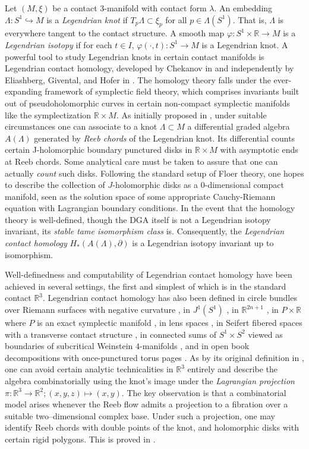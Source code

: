 \documentclass[11pt]{amsart}
\theoremstyle{mystyle}
\newcommand{\R}{\mathbb{R}}
\newcommand{\<}{\langle}
\renewcommand{\>}{\rangle}
\begin{document}
Let $(M,\xi)$ be a contact $3$-manifold with contact form $\lambda$. An embedding $\Lambda:S^1\hookrightarrow M$ is a \textit{Legendrian knot} if $T_p\Lambda\subset \xi_p$ for all $p\in \Lambda(S^1)$. That is, $\Lambda$ is everywhere tangent to the contact structure. A smooth map $\varphi:S^1\times \R\to M$ is a \textit{Legendrian isotopy} if for each $t\in I$, $\varphi(\cdot, t):S^1\to M$ is a Legendrian knot. A powerful tool to study Legendrian knots in certain contact manifolds is Legendrian contact homology, developed by Chekanov in \cite{chekanov2002dga} and independently by Eliashberg, Givental, and Hofer in \cite{egh2000SFT}. The homology theory falls under the ever-expanding framework of symplectic field theory, which comprises invariants built out of pseudoholomorphic curves in certain non-compact symplectic manifolds like the symplectization $\R\times M$. As initially proposed in \cite{egh2000SFT}, under suitable circumstances one can associate to a knot $\Lambda\subset M$ a differential graded algebra $A(\Lambda)$ generated by \textit{Reeb chords} of the Legendrian knot. Its differential counts certain J-holomorphic boundary punctured disks in $\R\times M$ with asymptotic ends at Reeb chords. Some analytical care must be taken to assure that one can actually \textit{count} such disks. Following the standard setup of Floer theory, one hopes to describe the collection of $J$-holomorphic disks as a $0$-dimensional compact manifold, seen as the solution space of some appropriate Cauchy-Riemann equation with Lagrangian boundary conditions. In the event that the homology theory is well-defined, though the DGA itself is not a Legendrian isotopy invariant, its \textit{stable tame isomorphism class} is. Consequently, the \textit{Legendrian contact homology} $H_*(A(\Lambda),\partial)$ is a Legendrian isotopy invariant up to isomorphism. 

Well-definedness and computability of Legendrian contact homology have been achieved in several settings, the first and simplest of which is in the standard contact $\R^3$. Legendrian contact homology has also been defined in circle bundles over Riemann surfaces with negative curvature \cite{sabloff2003circle}, in $J^1(S^1)$ \cite{NgTraynor2004}, in $\R^{2n+1}$ \cite{ekholm2005R2n+1}, in $P\times \R$ where $P$ is an exact symplectic manifold \cite{ekholm2007PxR} \cite{Bjorklund2016}, in lens spaces \cite{licata2011lensspaces}, in Seifert fibered spaces with a transverse contact structure \cite{licata2013seifert}, in connected sums of $S^1 \times S^2$ viewed as boundaries of subcritical Weinstein $4$-manifolds \cite{ekholmNg2015weinstein}, and in open book decompositions with once-punctured torus pages \cite{Brand2023}. As by its original definition in \cite{chekanov2002dga}, one can avoid certain analytic technicalities in $\R^{3}$ entirely and describe the algebra combinatorially using the knot’s image under the \textit{Lagrangian projection} $\pi:\R^3\to \R^2; (x,y,z)\mapsto (x,y)$. The key observation is that a combinatorial model arises whenever the Reeb flow admits a projection to a fibration over a suitable two–dimensional complex base. Under such a projection, one may identify Reeb chords with double points of the knot, and holomorphic disks with certain rigid polygons. This is proved in \cite{ENS2002}.
\end{document}
